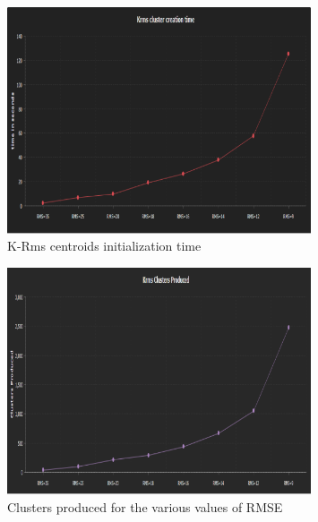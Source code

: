 \documentclass{article}
\begin{document}
{                    \begin{figure}[h]
                        \centering
                        \includegraphics[width=0.8\textwidth]{Figures/KrmsClusterCreationTime.PNG}
                        \caption{K-Rms centroids initialization time}
                        \label{fig:my_label}
                    \end{figure}
                    
                    \begin{figure}[h]
                        \centering
                        \includegraphics[width=0.8\textwidth]{Figures/K-RmsClusterProd.PNG}
                        \caption{Clusters produced for the various values of RMSE}
                        \label{fig:my_label}
                    \end{figure}
                    
}
\end{document}
